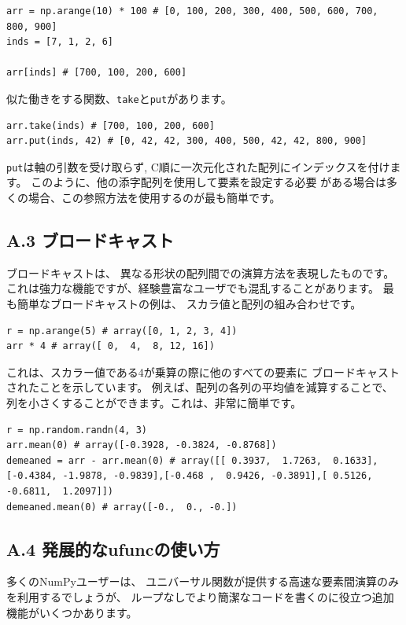 \documentclass{jsarticle}
\begin{document}
            \begin{lstlisting}
arr = np.arange(10) * 100 # [0, 100, 200, 300, 400, 500, 600, 700, 800, 900]
inds = [7, 1, 2, 6]

arr[inds] # [700, 100, 200, 600]\end{lstlisting}

            似た働きをする関数、\verb|take|と\verb|put|があります。

            \begin{lstlisting}
arr.take(inds) # [700, 100, 200, 600]
arr.put(inds, 42) # [0, 42, 42, 300, 400, 500, 42, 42, 800, 900]\end{lstlisting}

            \verb|put|は軸の引数を受け取らず,
            C順に一次元化された配列にインデックスを付けます。
            このように、他の添字配列を使用して要素を設定する必要
            がある場合は多くの場合、この参照方法を使用するのが最も簡単です。
    \subsection*{A.3 ブロードキャスト}
        ブロードキャストは、
        異なる形状の配列間での演算方法を表現したものです。
        これは強力な機能ですが、経験豊富なユーザでも混乱することがあります。
        最も簡単なブロードキャストの例は、
        スカラ値と配列の組み合わせです。

        \begin{lstlisting}
r = np.arange(5) # array([0, 1, 2, 3, 4])
arr * 4 # array([ 0,  4,  8, 12, 16])\end{lstlisting}

        これは、スカラー値である4が乗算の際に他のすべての要素に
        ブロードキャストされたことを示しています。
        例えば、配列の各列の平均値を減算することで、
        列を小さくすることができます。これは、非常に簡単です。

        \begin{lstlisting}
r = np.random.randn(4, 3)
arr.mean(0) # array([-0.3928, -0.3824, -0.8768])
demeaned = arr - arr.mean(0) # array([[ 0.3937,  1.7263,  0.1633],[-0.4384, -1.9878, -0.9839],[-0.468 ,  0.9426, -0.3891],[ 0.5126, -0.6811,  1.2097]])
demeaned.mean(0) # array([-0.,  0., -0.])\end{lstlisting}

    \subsection*{A.4 発展的なufuncの使い方}
        多くのNumPyユーザーは、
        ユニバーサル関数が提供する高速な要素間演算のみを利用するでしょうが、
        ループなしでより簡潔なコードを書くのに役立つ追加機能がいくつかあります。
\end{document}
